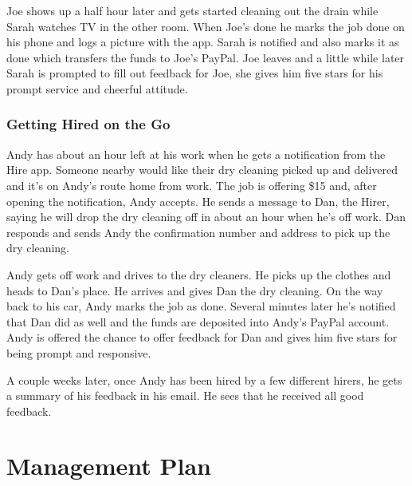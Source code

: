 \documentclass[11pt]{article}
\begin{document}
Joe shows up a half hour later and gets started cleaning out the drain while Sarah watches TV in the other room. When Joe's done he marks the job done on his phone and logs a picture with the app. Sarah is notified and also marks it as done which transfers the funds to Joe's PayPal. Joe leaves and a little while later Sarah is prompted to fill out feedback for Joe, she gives him five stars for his prompt service and cheerful attitude.

\subsubsection{Getting Hired on the Go}

Andy has about an hour left at his work when he gets a notification from the Hire app. Someone nearby would like their dry cleaning picked up and delivered and it's on Andy's route home from work. The job is offering \$15 and, after opening the notification, Andy accepts. He sends a message to Dan, the Hirer, saying he will drop the dry cleaning off in about an hour when he's off work. Dan responds and sends Andy the confirmation number and address to pick up the dry cleaning.

Andy gets off work and drives to the dry cleaners. He picks up the clothes and heads to Dan's place. He arrives and gives Dan the dry cleaning. On the way back to his car, Andy marks the job as done. Several minutes later he's notified that Dan did as well and the funds are deposited into Andy's PayPal account. Andy is offered the chance to offer feedback for Dan and gives him five stars for being prompt and responsive.

A couple weeks later, once Andy has been hired by a few different hirers, he gets a summary of his feedback in his email. He sees that he received all good feedback. 

%
\section{Management Plan}\label{management-plan}
\end{document}
